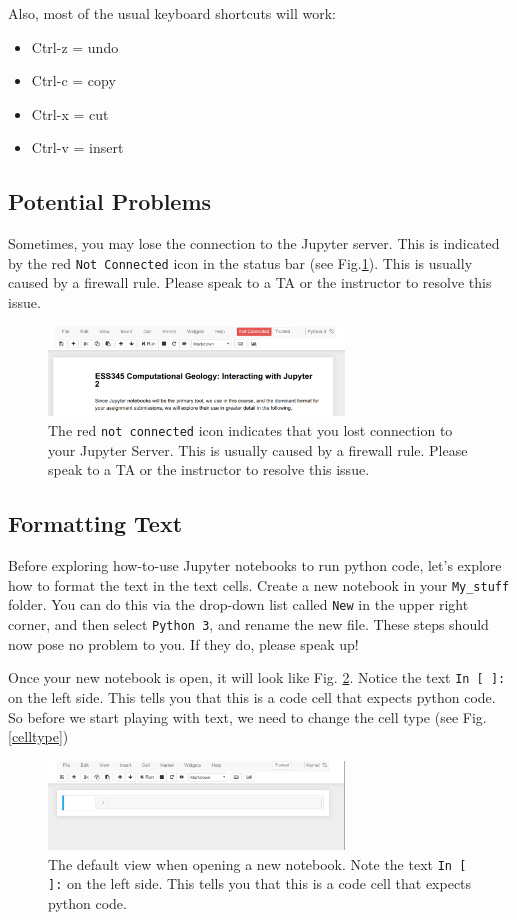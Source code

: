 \documentclass[svgnames, 11pt, lettersize]{article}
\begin{document}
Also, most of the usual keyboard shortcuts will work:
\begin{itemize}
\item Ctrl-z = undo
\item Ctrl-c = copy
\item Ctrl-x = cut
\item Ctrl-v = insert
\end{itemize}
\subsection{Potential Problems}
\label{sec:orgf207d61}
Sometimes, you may lose the connection to the Jupyter
server. This is indicated by the red \texttt{Not Connected} icon in the
status bar (see Fig.\ref{noconn}). This is usually caused by a firewall
rule. Please speak to a TA or the instructor to resolve this issue.
\begin{figure}[htbp]
\centering
\includegraphics[width=0.7\textwidth]{./figures/Screenshot_20200527_134756.png}
\caption{\label{noconn}The red \texttt{not connected} icon indicates that you lost connection to your Jupyter Server. This is usually caused by a firewall rule. Please speak to a TA or the instructor to resolve this issue.}
\end{figure}
\subsection{Formatting Text}
\label{sec:org8b41fc5}
Before exploring how-to-use Jupyter notebooks to run python code,
let's explore how to format the text in the text cells. Create  a
new notebook in your \texttt{My\_stuff} folder. You can do this via the drop-down list called \texttt{New} in the upper right corner, and then select
\texttt{Python 3}, and rename the new file. These steps should now pose no
problem to you. If they do, please speak up!

Once your new notebook is open, it will look like
Fig. \ref{nbfirst}. Notice the text \texttt{In [ ]:} on the left side. This
tells you that this is a code cell that expects python code. So before
we start playing with text, we need to change the cell type (see Fig. \ref{celltype})
\begin{figure}[htbp]
\centering
\includegraphics[width=0.7\textwidth]{./figures/Screenshot_20200527_145057.png}
\caption{\label{nbfirst}The default view when opening a new notebook. Note the text \texttt{In [ ]:} on the left side. This tells you that this is a code cell that expects python code.}
\end{figure}
\end{document}
